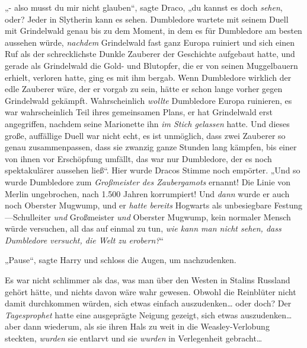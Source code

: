 „- also musst du mir nicht glauben“, sagte Draco, „du kannst es doch \emph{sehen}, oder? Jeder in Slytherin kann es sehen. Dumbledore wartete mit seinem Duell mit Grindelwald genau bis zu dem Moment, in dem es für Dumbledore am besten aussehen würde, \emph{nachdem} Grindelwald fast ganz Europa ruiniert und sich einen Ruf als der schrecklichste Dunkle Zauberer der Geschichte aufgebaut hatte, und gerade als Grindelwald die Gold- und Blutopfer, die er von seinen Muggelbauern erhielt, verloren hatte, ging es mit ihm bergab. Wenn Dumbledore wirklich der edle Zauberer wäre, der er vorgab zu sein, hätte er schon lange vorher gegen Grindelwald gekämpft. Wahrscheinlich \emph{wollte} Dumbledore Europa ruinieren, es war wahrscheinlich Teil ihres gemeinsamen Plans, er hat Grindelwald erst angegriffen, nachdem seine Marionette ihn \emph{im Stich gelassen} hatte. Und dieses große, auffällige Duell war nicht echt, es ist unmöglich, dass zwei Zauberer so genau zusammenpassen, dass sie zwanzig ganze Stunden lang kämpfen, bis einer von ihnen vor Erschöpfung umfällt, das war nur Dumbledore, der es noch spektakulärer aussehen ließ“. Hier wurde Dracos Stimme noch empörter. „Und so wurde Dumbledore zum \emph{Großmeister des Zaubergamots} ernannt! Die Linie von Merlin ungebrochen, nach 1.500 Jahren korrumpiert! Und \emph{dann} wurde er auch noch Oberster Mugwump, und er \emph{hatte bereits} Hogwarts als unbesiegbare Festung—Schulleiter \emph{und} Großmeister \emph{und} Oberster Mugwump, kein normaler Mensch würde versuchen, all das auf einmal zu tun, \emph{wie kann man nicht sehen, dass Dumbledore versucht, die Welt zu erobern?}“

„Pause“, sagte Harry und schloss die Augen, um nachzudenken.

Es war nicht schlimmer als das, was man über den Westen in Stalins Russland gehört hätte, und nichts davon wäre wahr gewesen. Obwohl die Reinblüter nicht damit durchkommen würden, sich etwas einfach auszudenken… oder doch? Der \emph{Tagesprophet} hatte eine ausgeprägte Neigung gezeigt, sich etwas auszudenken… aber dann wiederum, als sie ihren Hals zu weit in die Weasley-Verlobung steckten, \emph{wurden} sie entlarvt und sie \emph{wurden} in Verlegenheit gebracht…

